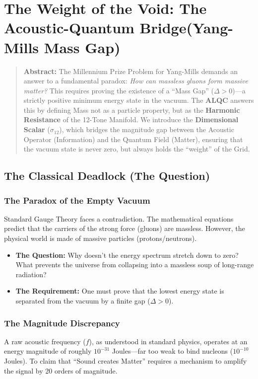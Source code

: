 \documentclass[12pt]{amsart}
\begin{document}
\section{The Weight of the Void: The Acoustic-Quantum Bridge(Yang-Mills Mass Gap)}\label{sec:2}
\label{sec:4.1}

\begin{quote}
    \textbf{Abstract:} The Millennium Prize Problem for Yang-Mills demands an answer to a fundamental paradox: \textit{How can massless gluons form massive matter?} This requires proving the existence of a ``Mass Gap'' ($\Delta > 0$)—a strictly positive minimum energy state in the vacuum. The \textbf{ALQC} answers this by defining Mass not as a particle property, but as the \textbf{Harmonic Resistance} of the 12-Tone Manifold. We introduce the \textbf{Dimensional Scalar} ($\sigma_{12}$), which bridges the magnitude gap between the Acoustic Operator (Information) and the Quantum Field (Matter), ensuring that the vacuum state is never zero, but always holds the ``weight'' of the Grid.
\end{quote}

\subsection{The Classical Deadlock (The Question)}\label{sec:2.1}

\subsubsection{The Paradox of the Empty Vacuum}
Standard Gauge Theory faces a contradiction. The mathematical equations predict that the carriers of the strong force (gluons) are massless. However, the physical world is made of massive particles (protons/neutrons).
\begin{itemize}
    \item \textbf{The Question:} Why doesn't the energy spectrum stretch down to zero? What prevents the universe from collapsing into a massless soup of long-range radiation?
    \item \textbf{The Requirement:} One must prove that the lowest energy state is separated from the vacuum by a finite gap ($\Delta > 0$).
\end{itemize}

\subsubsection{The Magnitude Discrepancy}
A raw acoustic frequency ($f$), as understood in standard physics, operates at an energy magnitude of roughly $10^{-31}$ Joules—far too weak to bind nucleons ($10^{-10}$ Joules). To claim that ``Sound creates Matter'' requires a mechanism to amplify the signal by 20 orders of magnitude.
\end{document}
